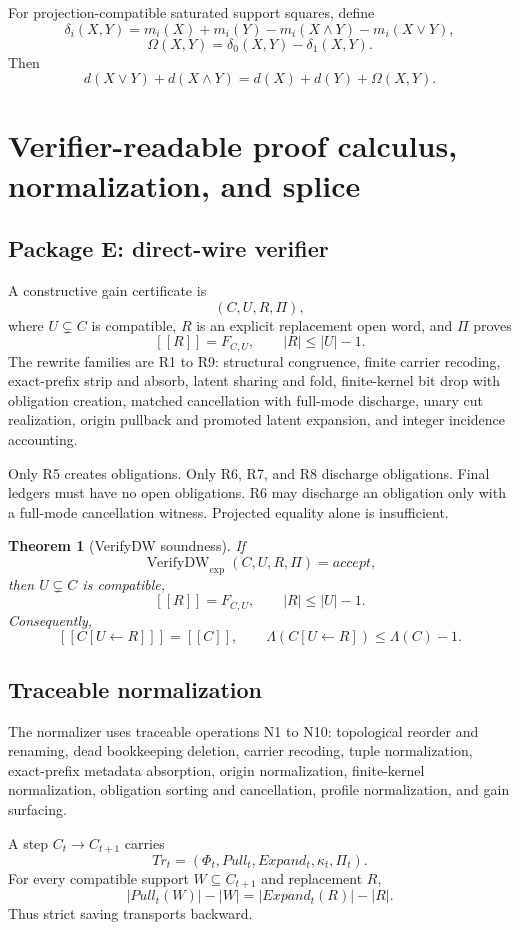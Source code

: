 \documentclass[10.5pt,a4paper]{article}
\newtheorem{theorem}{Theorem}[section]
\newcommand{\VerifyDW}{\operatorname{VerifyDW}_{\exp}}
\begin{document}
For projection-compatible saturated support squares, define
\[
\delta_i(X,Y)=m_i(X)+m_i(Y)-m_i(X\wedge Y)-m_i(X\vee Y),
\]
\[
\Omega(X,Y)=\delta_0(X,Y)-\delta_1(X,Y).
\]
Then
\[
\boxed{d(X\vee Y)+d(X\wedge Y)=d(X)+d(Y)+\Omega(X,Y).}
\]

\section{Verifier-readable proof calculus, normalization, and splice}

\subsection{Package E: direct-wire verifier}
A constructive gain certificate is
\[
(C,U,R,\Pi),
\]
where \(U\subsetneq C\) is compatible, \(R\) is an explicit replacement open word, and \(\Pi\) proves
\[
[[R]]=F_{C,U},\qquad |R|\le |U|-1.
\]
The rewrite families are R1 to R9: structural congruence, finite carrier recoding, exact-prefix strip and absorb, latent sharing and fold, finite-kernel bit drop with obligation creation, matched cancellation with full-mode discharge, unary cut realization, origin pullback and promoted latent expansion, and integer incidence accounting.

Only R5 creates obligations. Only R6, R7, and R8 discharge obligations. Final ledgers must have no open obligations. R6 may discharge an obligation only with a full-mode cancellation witness. Projected equality alone is insufficient.

\begin{theorem}[VerifyDW soundness]
If
\[
\VerifyDW(C,U,R,\Pi)=accept,
\]
then \(U\subsetneq C\) is compatible,
\[
[[R]]=F_{C,U},\qquad |R|\le |U|-1.
\]
Consequently,
\[
[[C[U\leftarrow R]]]=[[C]],\qquad \Lambda(C[U\leftarrow R])\le \Lambda(C)-1.
\]
\end{theorem}

\subsection{Traceable normalization}
The normalizer uses traceable operations N1 to N10: topological reorder and renaming, dead bookkeeping deletion, carrier recoding, tuple normalization, exact-prefix metadata absorption, origin normalization, finite-kernel normalization, obligation sorting and cancellation, profile normalization, and gain surfacing.

A step \(C_t\to C_{t+1}\) carries
\[
Tr_t=(\Phi_t,Pull_t,Expand_t,\kappa_t,\Pi_t).
\]
For every compatible support \(W\subseteq C_{t+1}\) and replacement \(R\),
\[
|Pull_t(W)|-|W|=|Expand_t(R)|-|R|.
\]
Thus strict saving transports backward.
\end{document}
